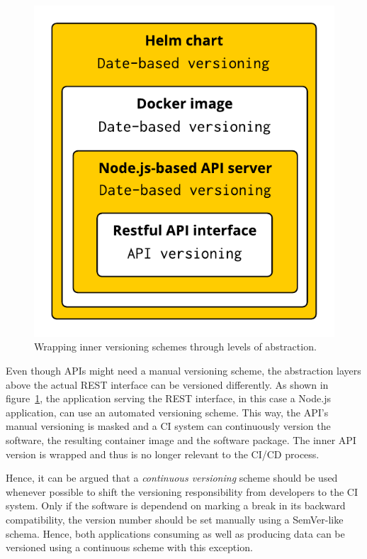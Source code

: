 \begin{figure}[H]
\begin{center}
  \includegraphics[scale=0.7]{images/figures/version_wrapping.pdf}
\end{center}
\caption{Wrapping inner versioning schemes through levels of abstraction.}%
\label{fig:version_wrapping}
\end{figure}

Even though \acp{API} might need a manual versioning scheme, the abstraction
layers above the actual \ac{REST} interface can be versioned differently. As
shown in figure~\ref{fig:version_wrapping}, the application serving the
\ac{REST} interface, in this case a Node.js application, can use an automated
versioning scheme. This way, the \ac{API}'s manual versioning is masked and a
\ac{CI} system can continuously version the software, the resulting container
image and the software package. The inner \ac{API} version is wrapped and thus
is no longer relevant to the \ac{CI}/\ac{CD} process.

Hence, it can be argued that a \textit{continuous versioning} scheme should be
used whenever possible to shift the versioning responsibility from developers
to the \ac{CI} system. Only if the software is dependend on marking a break in
its backward compatibility, the version number should be set manually using a
SemVer-like schema. Hence, both applications consuming as well as producing
data can be versioned using a continuous scheme with this exception.

